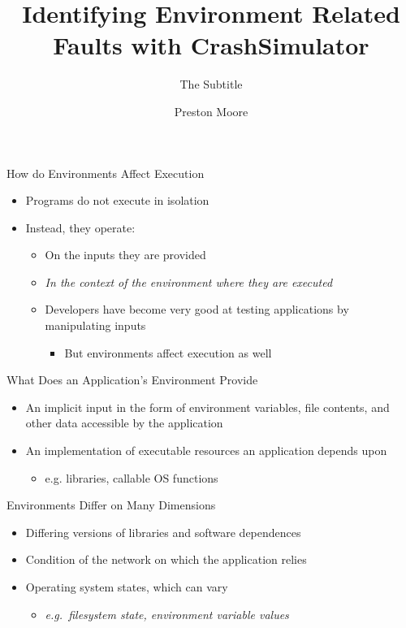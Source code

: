 \documentclass[pdf]{beamer}
\title{Identifying Environment Related Faults with CrashSimulator}
\subtitle{The Subtitle}
\author{Preston Moore}
\begin{document}
\begin{frame}
  \titlepage{}
\end{frame}


\begin{frame}{How do Environments Affect Execution}
  \begin{itemize}
  \item{Programs do not execute in isolation}
  \item{Instead, they operate:}
    \begin{itemize}
    \item{On the inputs they are provided}
    \item{\textit{In the context of the environment where they are executed}}
    \item{Developers have become very good at testing applications by
        manipulating inputs}
      \begin{itemize}
        \item{But environments affect execution as well}
      \end{itemize}
    \end{itemize}
  \end{itemize}
\end{frame}


\begin{frame}{What Does an Application's Environment Provide}
  \begin{itemize}
  An application's environment provides:
  \item{An implicit input in the form of environment variables, file
      contents, and other data accessible by the application}
  \item{An implementation of executable resources an application depends upon}
    \begin{itemize}
    \item{e.g. libraries, callable OS functions}
    \end{itemize}
\end{itemize}
\end{frame}


\begin{frame}{Environments Differ on Many Dimensions}
  \begin{itemize}
  \item{Differing versions of libraries and software dependences}
  \item{Condition of the network on which the application relies}
  \item{Operating system states, which can vary}
    \begin{itemize}
    \item{\textit{e.g.\ filesystem state, environment variable values}}
    \end{itemize}
  \end{itemize}
\end{frame}
\end{document}
